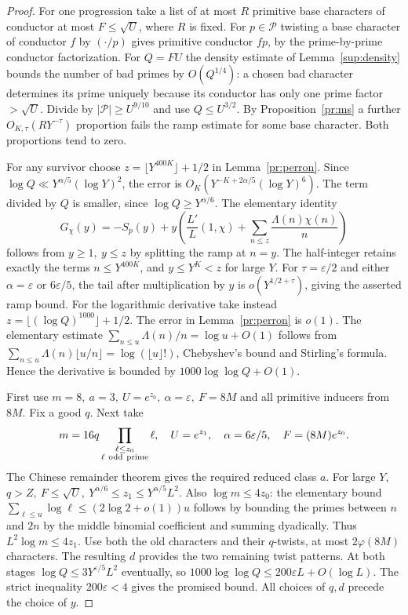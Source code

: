 \begin{proof}
For one progression take a list of at most \(R\) primitive base characters
of conductor at most \(F\le\sqrt U\), where \(R\) is fixed. For \(p\in
\mathcal P\) twisting a base character of conductor \(f\) by \((\cdot/p)\)
gives primitive conductor \(fp\), by the prime-by-prime conductor factorization.
For \(Q=FU\) the density estimate of Lemma~\ref{sup:density} bounds the
number of bad primes by \(O(Q^{1/4})\): a chosen bad character determines
its prime uniquely because its conductor has only one prime factor \(>\sqrt U\).
Divide by \(|\mathcal P|\ge U^{9/10}\) and use \(Q\le U^{3/2}\).
By Proposition~\ref{pr:ms} a further \(O_{K,\tau}(RY^{-\tau})\) proportion
fails the ramp estimate for some base character. Both proportions tend to zero.

For any survivor choose \(z=\lfloor Y^{400K}\rfloor+1/2\) in
Lemma~\ref{pr:perron}. Since \(\log Q\ll Y^{\alpha/5}(\log Y)^2\),
the error is \(O_K(Y^{-K+2\alpha/5}(\log Y)^6)\). The term divided by \(Q\)
is smaller, since \(\log Q\ge Y^{\alpha/6}\). The elementary identity
\[
 G_\chi(y)=-S_p(y)+y\left(\frac{L'}L(1,\chi)
                           +\sum_{n\le z}\frac{\Lambda(n)\chi(n)}n\right)
\]
follows from \(y\ge1,\ y\le z\) by splitting the ramp at \(n=y\).
The half-integer retains exactly the terms \(n\le Y^{400K}\), and
\(y\le Y^K<z\) for large \(Y\).
For \(\tau=\varepsilon/2\) and either \(\alpha=\varepsilon\) or
\(6\varepsilon/5\), the tail after multiplication by \(y\) is
\(o(Y^{1/2+\tau})\), giving the asserted ramp bound.
For the logarithmic derivative take instead
\(z=\lfloor(\log Q)^{1000}\rfloor+1/2\).
The error in Lemma~\ref{pr:perron} is \(o(1)\). The elementary estimate
\(\sum_{n\le u}\Lambda(n)/n=\log u+O(1)\) follows from
\(\sum_{n\le u}\Lambda(n)\lfloor u/n\rfloor=\log(\lfloor u\rfloor!)\),
Chebyshev's bound and Stirling's formula. Hence the derivative is bounded
by \(1000\log\log Q+O(1)\).

First use \(m=8,\ a=3,\ U=e^{z_0},\ \alpha=\varepsilon,\ F=8M\)
and all primitive inducers from \(8M\). Fix a good \(q\). Next take
\[
 m=16q\prod_{\substack{\ell\le z_0\\\ell\ {\rm odd\ prime}}}\ell,\quad
 U=e^{z_1},\quad \alpha=6\varepsilon/5,\quad F=(8M)e^{z_0}.
\]
The Chinese remainder theorem gives the required reduced class \(a\).
For large \(Y\), \(q>Z,\ F\le\sqrt U,\ Y^{\alpha/6}\le z_1
\le Y^{\alpha/5}L^2\). Also \(\log m\le4z_0\): the elementary bound
\(\sum_{\ell\le u}\log\ell\le(2\log2+o(1))u\) follows by bounding
the primes between \(n\) and \(2n\) by the middle binomial coefficient
and summing dyadically. Thus \(L^2\log m\le4z_1\).
Use both the old characters and their \(q\)-twists, at most \(2\varphi(8M)\)
characters. The resulting \(d\) provides the two remaining twist patterns.
At both stages \(\log Q\le3Y^{\varepsilon/5}L^2\) eventually, so
\(1000\log\log Q\le200\varepsilon L+O(\log L)\). The strict inequality
\(200\varepsilon<4\) gives the promised bound. All choices of \(q,d\)
precede the choice of \(y\).
\end{proof}
